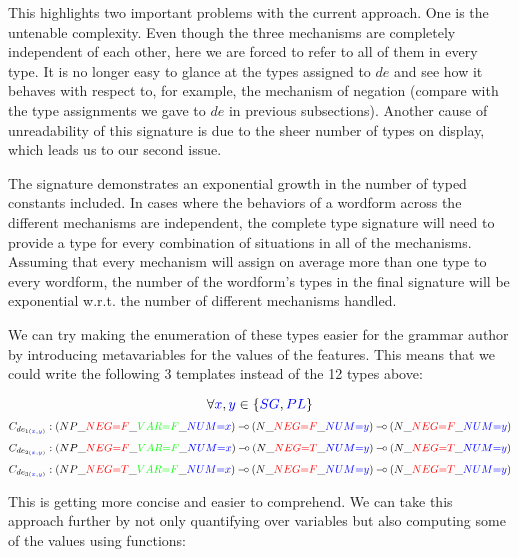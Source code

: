 This highlights two important problems with the current approach. One is
the untenable complexity. Even though the three mechanisms are
completely independent of each other, here we are forced to refer to all
of them in every type. It is no longer easy to glance at the types
assigned to $de$ and see how it behaves with respect to, for example,
the mechanism of negation (compare with the type assignments we gave to
$de$ in previous subsections). Another cause of unreadability of this
signature is due to the sheer number of types on display, which leads us
to our second issue.

The signature demonstrates an exponential growth in the number of typed
constants included. In cases where the behaviors of a wordform across
the different mechanisms are independent, the complete type signature
will need to provide a type for every combination of situations in all
of the mechanisms. Assuming that every mechanism will assign on average
more than one type to every wordform, the number of the wordform's types
in the final signature will be exponential w.r.t. the number of
different mechanisms handled.

We can try making the enumeration of these types easier for the grammar
author by introducing metavariables for the values of the features. This
means that we could write the following 3 templates instead of the 12
types above:

$$
\forall \textcolor{blue}{x}, \textcolor{blue}{y} \in \{\textcolor{blue}{SG}, \textcolor{blue}{PL}\}
$$
$$
C_{de_{1(\textcolor{blue}{x}, \textcolor{blue}{y})}} : (NP\_\textcolor{red}{NEG{=}F}\_\textcolor{green}{VAR{=}F}\_\textcolor{blue}{NUM{=}x}) \mathbin{{-}\mkern-3.5mu{\circ}} (N\_\textcolor{red}{NEG{=}F}\_\textcolor{blue}{NUM{=}y}) \mathbin{{-}\mkern-3.5mu{\circ}} (N\_\textcolor{red}{NEG{=}F}\_\textcolor{blue}{NUM{=}y})
$$
$$
C_{de_{2(\textcolor{blue}{x}, \textcolor{blue}{y})}} : (NP\_\textcolor{red}{NEG{=}F}\_\textcolor{green}{VAR{=}F}\_\textcolor{blue}{NUM{=}x}) \mathbin{{-}\mkern-3.5mu{\circ}} (N\_\textcolor{red}{NEG{=}T}\_\textcolor{blue}{NUM{=}y}) \mathbin{{-}\mkern-3.5mu{\circ}} (N\_\textcolor{red}{NEG{=}T}\_\textcolor{blue}{NUM{=}y})
$$
$$
C_{de_{3(\textcolor{blue}{x}, \textcolor{blue}{y})}} : (NP\_\textcolor{red}{NEG{=}T}\_\textcolor{green}{VAR{=}F}\_\textcolor{blue}{NUM{=}x}) \mathbin{{-}\mkern-3.5mu{\circ}} (N\_\textcolor{red}{NEG{=}F}\_\textcolor{blue}{NUM{=}y}) \mathbin{{-}\mkern-3.5mu{\circ}} (N\_\textcolor{red}{NEG{=}T}\_\textcolor{blue}{NUM{=}y})
$$

This is getting more concise and easier to comprehend. We can take this
approach further by not only quantifying over variables but also
computing some of the values using functions:

